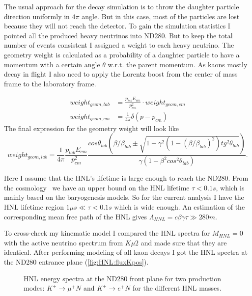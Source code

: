 \documentclass[../main.tex]{subfiles}
\begin{document}
The usual approach for the decay simulation is to throw the daughter particle direction uniformly in $4\pi$ angle. But in this case, most of the particles are lost because they will not reach the detector. To gain the simulation statistics I pointed all the produced heavy neutrinos into ND280. But to keep the total number of events consistent I assigned a weight to each heavy neutrino. The geometry weight is calculated as a probability of a daughter particle to have a momentum with a certain angle $\theta$ w.r.t. the parent momentum. As kaons mostly decay in flight I also need to apply the Lorentz boost from the center of mass frame to the laboratory frame.

\begin{align}
    weight_{geom, lab}&=\frac{p_{lab}E_{cm}}{p_{cm}^2}\cdot weight_{geom,cm}
    \nonumber \\
    weight_{geom, cm} &= \frac{1}{4\pi}\delta\left(p-p_{cm}\right)
\end{align}
The final expression for the geometry weight will look like
\begin{equation}
    weight_{geom, lab}=\frac{1}{4\pi}\frac{p_{lab}E_{cm}}{p_{cm}^2}\frac{cos\theta_{lab}\left(\beta/\beta_{lab}\pm\sqrt{1+\gamma^2\left(1-\left(\beta/\beta_{lab}\right)^2\right)tg^2\theta_{lab}}\right)}{\gamma\left(1-\beta^{2}cos^{2}\theta_{lab}\right)}.
    \label{eq:HNL:lorentz}
\end{equation}

Here I assume that the HNL's lifetime is large enough to reach the ND280. From the cosmology~\cite{Gorbunov2007} we have an upper bound on the HNL lifetime  $\tau < 0.1s$, which is mainly based on the baryogenesis models. So for the current analysis I have the HNL lifetime region $1\mu s\ll\tau<0.1s$ which is wide enough. An estimation of the corresponding mean free path of the HNL gives $\Lambda_{HNL}=c\beta\gamma\tau\gg280 m$.

To cross-check my kinematic model I compared the HNL spectra for $M_{HNL}=0$ with the active neutrino spectrum from $K\mu2$ and made sure that they are identical. After performing modeling of all kaon decays I got the HNL spectra at the ND280 entrance plane (\autoref{fig:HNL:fluxKpos}).

\begin{figure}[!ht]
    \begin{minipage}{0.49\linewidth}
    \end{minipage}
    \hfill
    \begin{minipage}{0.49\linewidth}
    \end{minipage}
    \caption{HNL energy spectra at the ND280 front plane for two production modes: $K^+\rightarrow \mu^+N$ and $K^+\rightarrow e^+N$ for the different HNL masses.}
    \label{fig:HNL:fluxKpos}
\end{figure}
\end{document}
